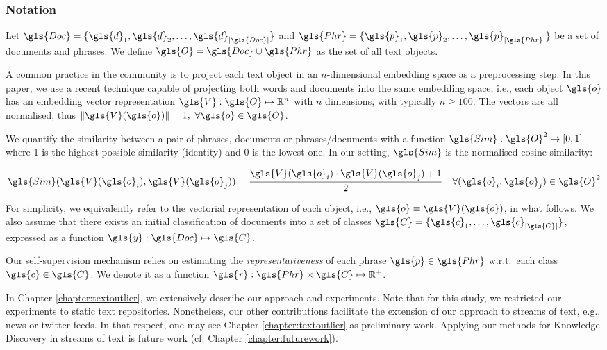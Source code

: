 \subsubsection{Notation}

Let $\gls{Doc} = \{\gls{d}_1, \gls{d}_2, \dots, \gls{d}_{|\gls{Doc}|}\}$ and $\gls{Phr} = \{\gls{p}_1, \gls{p}_2, \dots, \gls{p}_{|\gls{Phr}|}\}$ 
be a set of documents and phrases. We define $\gls{O} = \gls{Doc} \cup \gls{Phr}$ as the set of all text objects. 

A common practice in the community is to project each text object in an $n$-dimensional embedding space as a preprocessing step. In this paper, we use a recent technique \cite{meng2019spherical} capable of projecting both words and documents into the same embedding space, i.e., each object $\gls{o}$ has an embedding vector representation $\gls{V}: \gls{O} \mapsto \mathbb{R}^n$ with $n$ dimensions, with typically $n \geq 100$. The vectors are all normalised, thus $\| \gls{V}(\gls{o}) \| = 1,~\forall \gls{o} \in \gls{O}$.

We quantify the similarity between a pair of phrases, documents or phrases/documents with a function $\gls{Sim}: \gls{O}^2 \mapsto [0,1]$ where $1$ is the highest possible similarity (identity) and $0$ is the lowest one. In our setting, $\gls{Sim}$ is the normalised cosine similarity: 

\begin{equation}
\label{eq:cosinesimilarity}
\gls{Sim}(\gls{V}(\gls{o}_i), \gls{V}(\gls{o}_j)) = \frac{\gls{V}(\gls{o}_i) \cdot  \gls{V}(\gls{o}_j) + 1}{2} \quad \forall (\gls{o}_i, \gls{o}_j) \in \gls{O}^2
\end{equation}

For simplicity, we equivalently refer to the vectorial representation of each object, i.e., $\gls{o} \equiv \gls{V}(\gls{o})$, in what follows. We also assume that there exists an initial classification of documents into a set of classes $\gls{C} = \{\gls{c}_1, \dots, \gls{c}_{|\gls{C}|}\}$, expressed as a function $\mathit{\gls{y}}: \gls{Doc} \mapsto \gls{C}$. 

Our self-supervision mechanism relies on estimating the \textit{representativeness} of each phrase $\gls{p} \in \gls{Phr}$ w.r.t.\ each class $\gls{c} \in\gls{C}$. We denote it as a function $\mathit{\gls{r}}: \gls{Phr} \times \gls{C} \mapsto \mathbb{R}^+$. 

In Chapter \ref{chapter:textoutlier}, we extensively describe our approach and experiments. Note that for this study, we restricted our experiments to static text repositories. Nonetheless, our other contributions facilitate the extension of our approach to streams of text, e.g., news or twitter feeds. In that respect, one may see Chapter \ref{chapter:textoutlier} as preliminary work. Applying our methods for Knowledge Discovery in streams of text is future work (cf. Chapter \ref{chapter:futurework}). 


